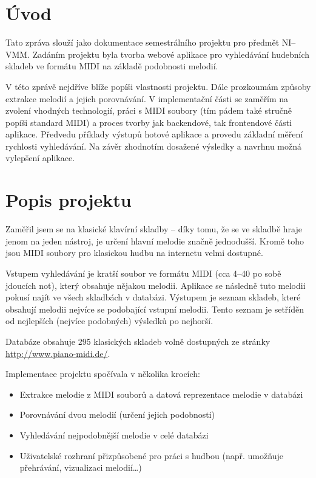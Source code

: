 \section{Úvod}
Tato zpráva slouží jako dokumentace semestrálního projektu pro předmět NI--VMM. Zadáním projektu byla tvorba webové aplikace pro vyhledávání hudebních skladeb ve formátu MIDI na základě podobnosti melodií.

V této zprávě nejdříve blíže popíši vlastnosti projektu. Dále prozkoumám způsoby extrakce melodií a jejich porovnávání. V implementační části se zaměřím na zvolení vhodných technologií, práci s MIDI soubory (tím pádem také stručně popíši standard MIDI) a proces tvorby jak backendové, tak frontendové části aplikace. Předvedu příklady výstupů hotové aplikace a provedu základní měření rychlosti vyhledávání. Na závěr zhodnotím dosažené výsledky a navrhnu možná vylepšení aplikace.

\pagebreak
\section{Popis projektu}
Zaměřil jsem se na klasické klavírní skladby -- díky tomu, že se ve skladbě hraje jenom na jeden nástroj, je určení hlavní melodie značně jednodušší. Kromě toho jsou MIDI soubory pro klasickou hudbu na internetu velmi dostupné.

Vstupem vyhledávání je kratší soubor ve formátu MIDI (cca 4--40 po sobě jdoucích not), který obsahuje nějakou melodii. Aplikace se následně tuto melodii pokusí najít ve všech skladbách v databázi. Výstupem je seznam skladeb, které obsahují melodii nejvíce se podobající vstupní melodii. Tento seznam je setříděn od nejlepších (nejvíce podobných) výsledků po nejhorší.

Databáze obsahuje 295 klasických skladeb volně dostupných ze stránky \url{http://www.piano-midi.de/}.

Implementace projektu spočívala v několika krocích:
\begin{itemize}
    \item Extrakce melodie z MIDI souborů a datová reprezentace melodie v databázi
    \item Porovnávání dvou melodií (určení jejich podobnosti)
    \item Vyhledávání nejpodobnější melodie v celé databázi
    \item Uživatelské rozhraní přizpůsobené pro práci s hudbou (např. umožňuje přehrávání, vizualizaci melodií\ldots)
\end{itemize}
